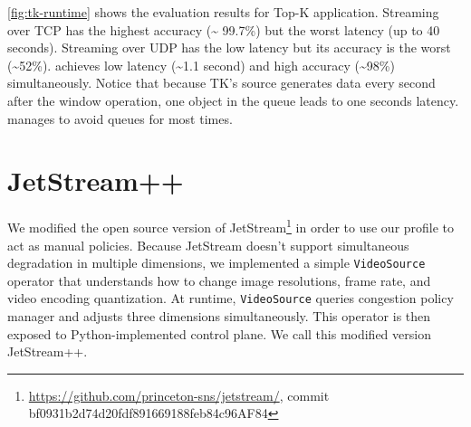 \documentclass[twocolumn, 9pt]{article}
\begin{document}
\autoref{fig:tk-runtime} shows the evaluation results for Top-K
application. Streaming over TCP has the highest accuracy (\textasciitilde
99.7\%) but the worst latency (up to 40 seconds). Streaming over UDP has the low
latency but its accuracy is the worst (\textasciitilde 52\%). \sysname{}
achieves low latency (\textasciitilde 1.1 second) and high accuracy
(\textasciitilde 98\%) simultaneously. Notice that because TK's source generates
data every second after the window operation, one object in the queue leads to
one seconds latency. \sysname{} manages to avoid queues for most times.


\section{JetStream++}
\label{appendix:jetstream++}

We modified the open source version of
JetStream\footnote{\url{https://github.com/princeton-sns/jetstream/}, commit
  bf0931b2d74d20fdf891669188feb84c96AF84} in order to use our profile to act as
manual policies. Because JetStream doesn't support simultaneous degradation in
multiple dimensions, we implemented a simple \texttt{VideoSource} operator that
understands how to change image resolutions, frame rate, and video encoding
quantization. At runtime, \texttt{VideoSource} queries congestion policy manager
and adjusts three dimensions simultaneously. This operator is then exposed to
Python-implemented control plane. We call this modified version JetStream++.
\end{document}
